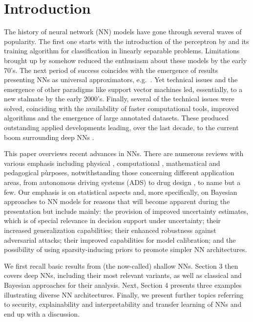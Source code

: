 
\section{Introduction}

The history of neural network (NN) models have gone 
through several waves of popularity. The first 
one starts with the introduction of the perceptron
by \cite{rosenblatt1958perceptron} and its training algorithm 
for classification in linearly separable problems.
Limitations brought up by 
\cite{minsky} somehow reduced the enthusiasm
about these models by the early 70's.
The next period of success coincides with the emergence
of results presenting NNs as universal
approximators, e.g.\ \cite{cybenko1989approximation}. Yet 
technical issues and the emergence of other paradigms like 
support vector machines led, essentially,
to a new stalmate by the early 2000's. Finally, several of the 
technical issues were solved, coinciding with the 
availability of faster computational tools,
improved algorithms and the emergence of
large annotated datasets. These produced outstanding 
applied developments leading, over the last decade, to the current boom 
surrounding deep NNs \cite{deeplearningbook}. 

This paper overviews  
recent advances in NNs. 
There are numerous reviews with various emphasis 
including physical \cite{cirac}, computational \cite{chollet}, mathematical \cite{maths} and pedagogical \cite{teach} pùrposes, 
notwithstanding  those concerning different  application areas, 
from autonomous driving systems (ADS) \cite{rumanos} to
drug design \cite{hessler}, to name but a few. 
Our emphasis is on statistical
aspects and, more specifically, on Bayesian approaches
to NN models for reasons that will become 
apparent during the presentation but include mainly:
the provision of improved uncertainty estimates, which is
of special relevance in decision support under uncertainty; their 
increased generalization capabilities; their 
enhanced robustness against adversarial attacks; 
their improved capabilities for model calibration;
and the possibility of using sparsity-inducing priors
to promote simpler NN architectures.

We first recall basic results from (the now-called) 
shallow NNs.
Section 3 then covers deep NNs, including their most
relevant 
variants, as well as classical and Bayesian approaches
for their analysis. Next, Section 4
presents three examples illustrating
diverse NN architectures. Finally, we present 
further topics referring to security, explainability and
interpretability and transfer 
learning of NNs and end up with a discussion.

